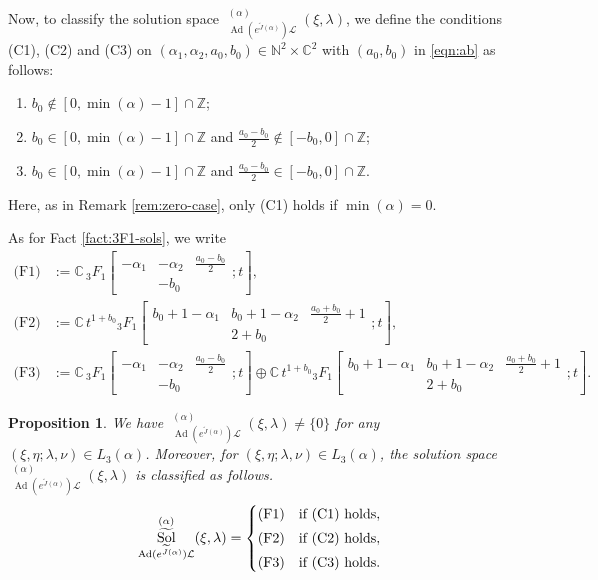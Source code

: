 \documentclass[a4paper,11pt,reqno]{amsart}
\newcommand{\CC}{\mathbb{C}}
\newcommand{\calL}{\mathcal{L}}
\newcommand{\0}{{\bf 0}}
\newcommand{\N}{\mathbb{N}}
\newcommand{\Z}{\mathbb{Z}}
\newcommand{\C}{\mathbb{C}}
\newcommand{\1}{{\bf 1}}
\DeclareMathOperator{\Ad}{Ad}
\DeclareMathOperator{\Sol}{Sol}
\newcommand{\wJ}{\widetilde{J}}
\DeclareMathOperator{\wSol}{\widetilde{\Sol}}
\theoremstyle{plain}
\newtheorem{proposition}[equation]{Proposition}
\theoremstyle{definition}
\numberwithin{equation}{section}
\theoremstyle{definition}
\begin{document}
Now, to classify 
the solution space $\wSol_{\Ad(e^{\wJ(\alpha)}) \calL}^{(\alpha)}(\xi,\lambda)$,
we define the conditions (C1), (C2) and (C3) on 
$(\alpha_1, \alpha_2, a_0, b_0) \in \N^2\times \C^2$
with $(a_0, b_0)$ in \eqref{eqn:ab}  as follows:
\vspace{2pt}
\begin{enumerate}[label=\normalfont{(\arabic*)}]
\item[(C1)] $b_0 \notin [0,\min(\alpha)-1]\cap \Z$;
\vspace{2pt}
\item[(C2)] $b_0 \in [0,\min(\alpha)-1]\cap \Z$ and 
$\frac{a_0-b_0}{2} \notin [-b_0,0]\cap \Z$;
\vspace{2pt}
\item[(C3)] $b_0\in [0,\min(\alpha)-1]\cap \Z$ 
and $\frac{a_0-b_0}{2}\in [-b_0,0]\cap \Z$.
\end{enumerate}
Here, as in Remark \ref{rem:zero-case},
only (C1) holds if $\min(\alpha)=0$.

As for Fact \ref{fact:3F1-sols},
we write
\begin{align*}
\text{(F1)}
&:=\CC\, 
{}_3F_1\left [\begin{matrix}
-\alpha_1& -\alpha_2 & \frac{a_0-b_0}{2} \\
& -b_0 &  
\end{matrix};t\right ], \\[3pt]
\text{(F2)}
&:=
\CC\, 
t^{1+b_0}{}_3F_1
\left [\begin{matrix}
b_0+1-\alpha_1& b_0+1-\alpha_2 & \frac{a_0+b_0}{2}+1 \\
& 2+b_0 &  
\end{matrix};t\right ], \\[3pt]
\text{(F3)}
&:=
\CC\, 
{}_3F_1\left [\begin{matrix}
-\alpha_1& -\alpha_2 & \frac{a_0-b_0}{2} \\
& -b_0 &  
\end{matrix};t\right ] 
\oplus
\CC\, 
t^{1+b_0}{}_3F_1
\left [\begin{matrix}
b_0+1-\alpha_1& b_0+1-\alpha_2 & \frac{a_0+b_0}{2}+1 \\
& 2+b_0 &  
\end{matrix};t\right ].
\end{align*}

\begin{proposition}\label{prop:SolDsec7}
We have
$\wSol_{\Ad(e^{\wJ(\alpha)}) \calL}^{(\alpha)}(\xi,\lambda)\neq \{0\}$
for any $(\xi, \eta; \lambda, \nu) \in L_3(\alpha)$.
Moreover, for $(\xi, \eta; \lambda, \nu) \in L_3(\alpha)$,
the solution space $\wSol_{\Ad(e^{\wJ(\alpha)}) \calL}^{(\alpha)}(\xi,\lambda)$ 
is classified as follows.
\begin{align*}
\wSol_{\Ad(e^{\wJ(\alpha)}) \calL}^{(\alpha)}(\xi,\lambda)
=
\begin{cases}
\textnormal{(F1)}
& \textnormal{if (C1) holds},\\[3pt]
\textnormal{(F2)}
& \textnormal{if (C2) holds},\\[3pt]
\textnormal{(F3)}
& \textnormal{if (C3) holds}.
\end{cases}
\end{align*}
\end{proposition}
\end{document}
